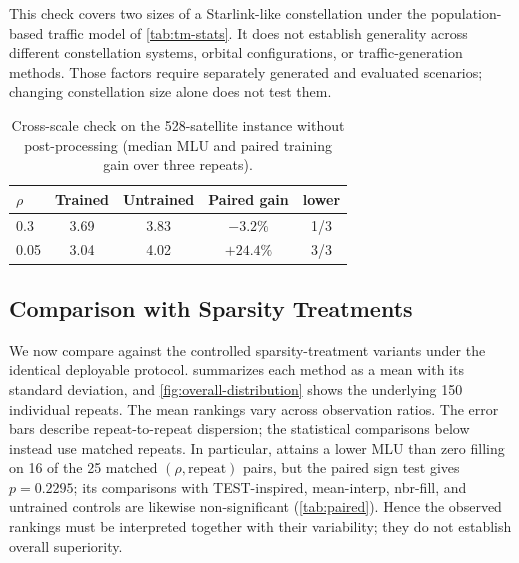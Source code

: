 This check covers two sizes of a Starlink-like constellation under the
population-based traffic model of \cref{tab:tm-stats}. It does not establish
generality across different constellation systems, orbital configurations,
or traffic-generation methods. Those factors require separately generated
and evaluated scenarios; changing constellation size alone does not test
them.

\begin{table}[t]
    \caption{Cross-scale check on the 528-satellite instance without
    post-processing (median MLU and paired training gain over three repeats).}
    \label{tab:cross-scale}
    \centering
    \footnotesize
    \setlength{\tabcolsep}{4pt}
    \begin{tabular}{@{}lcccc@{}}
        \toprule
        $\rho$ & Trained & Untrained & Paired gain & \sysname{} lower \\
        \midrule
        0.3  & 3.69 & 3.83 & $-3.2\%$  & 1/3 \\
        0.05 & 3.04 & 4.02 & $+24.4\%$ & 3/3 \\
        \bottomrule
    \end{tabular}
\end{table}

\subsection{Comparison with Sparsity Treatments}
\label{sec:overall}

We now compare \sysname{} against the controlled sparsity-treatment variants
under the identical deployable protocol.  summarizes each
method as a mean with its standard deviation, and
\cref{fig:overall-distribution} shows the underlying 150 individual repeats.
The mean rankings vary across observation ratios. The error bars describe
repeat-to-repeat dispersion; the statistical comparisons below instead use
matched repeats. In particular, \sysname{} attains a lower MLU than zero
filling on 16 of the 25
matched $(\rho,\text{repeat})$ pairs, but the paired sign test gives
$p=0.2295$; its comparisons with TEST-inspired, mean-interp, nbr-fill, and
untrained controls are likewise non-significant (\cref{tab:paired}). Hence
the observed rankings must be interpreted together with their variability;
they do not establish overall superiority.

